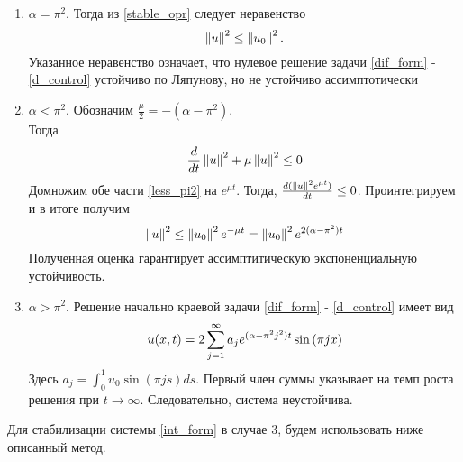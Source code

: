 \begin{enumerate}
\item $\alpha = \pi^2$. Тогда из \eqref{stable_opr} следует неравенство
\begin{equation}
	\left\lVert u\right\rVert^2 \le \left\lVert u_0\right\rVert^2.
\end{equation}
Указанное неравенство означает, что нулевое решение задачи \eqref{dif_form} - \eqref{d_control} устойчиво по Ляпунову, но не устойчиво ассимптотически
\item $\alpha < \pi^2$. Обозначим $\frac{\mu}{2} = -(\alpha - \pi^2)$.\\
Тогда
\begin{equation}\label{less_pi2}
	\frac{d}{dt}\left\lVert u\right\rVert^2 + \mu \left\lVert u\right\rVert^2 \le 0
\end{equation}
Домножим обе части \eqref{less_pi2} на $e^{\mu t}$. Тогда, $\frac{d(\left\lVert u\right\rVert^2 e^{\mu t})}{dt} \le 0$. Проинтегрируем и в итоге получим
\begin{equation*}
	\left\lVert u\right\rVert^2 \le \left\lVert u_0\right\rVert^2 e^{-\mu t} = \left\lVert u_0\right\rVert^2 e^{2(\alpha - \pi^2) t}
\end{equation*}
Полученная оценка гарантирует ассимптитическую экспоненциальную устойчивость.
\item $\alpha > \pi^2$. Решение начально краевой задачи \eqref{dif_form} - \eqref{d_control} имеет вид
\begin{equation}
	u(x, t) = 2 \sum \limits_{j=1}^{\infty}{a_j e^{(\alpha - \pi^2 j^2)t}\sin{(\pi j x)}}
\end{equation}
Здесь $a_j = \int_0^1{u_0 \sin{(\pi j s)} ds}$. Первый член суммы указывает на темп роста решения при $t \rightarrow \infty$. Следовательно, система неустойчива.
\end{enumerate}


Для стабилизации системы \eqref{int_form} в случае 3, будем использовать ниже описанный метод.\\
